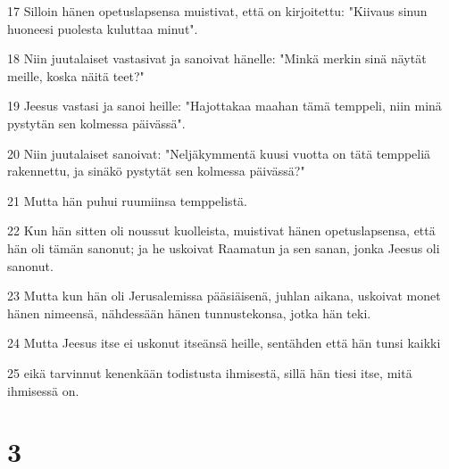 \par 17 Silloin hänen opetuslapsensa muistivat, että on kirjoitettu: "Kiivaus sinun huoneesi puolesta kuluttaa minut".
\par 18 Niin juutalaiset vastasivat ja sanoivat hänelle: "Minkä merkin sinä näytät meille, koska näitä teet?"
\par 19 Jeesus vastasi ja sanoi heille: "Hajottakaa maahan tämä temppeli, niin minä pystytän sen kolmessa päivässä".
\par 20 Niin juutalaiset sanoivat: "Neljäkymmentä kuusi vuotta on tätä temppeliä rakennettu, ja sinäkö pystytät sen kolmessa päivässä?"
\par 21 Mutta hän puhui ruumiinsa temppelistä.
\par 22 Kun hän sitten oli noussut kuolleista, muistivat hänen opetuslapsensa, että hän oli tämän sanonut; ja he uskoivat Raamatun ja sen sanan, jonka Jeesus oli sanonut.
\par 23 Mutta kun hän oli Jerusalemissa pääsiäisenä, juhlan aikana, uskoivat monet hänen nimeensä, nähdessään hänen tunnustekonsa, jotka hän teki.
\par 24 Mutta Jeesus itse ei uskonut itseänsä heille, sentähden että hän tunsi kaikki
\par 25 eikä tarvinnut kenenkään todistusta ihmisestä, sillä hän tiesi itse, mitä ihmisessä on.

\chapter{3}

